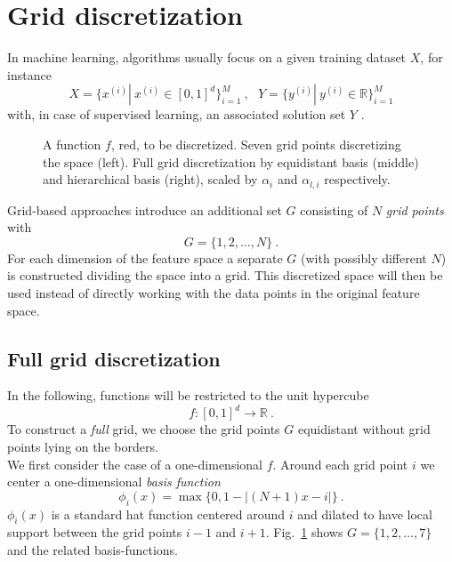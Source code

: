 \section{Grid discretization}\label{sec:grid}

In machine learning, algorithms usually focus on a given training dataset
$X$, for instance
$$ X = \{x^{(i)} | \ x^{(i)} \in [0, 1]^d\}_{i = 1}^M \ , \ \ \
Y = \{y^{(i)} | \ y^{(i)} \in \mathbb{R}\}_{i=1}^M$$
with, in case of supervised learning, an associated solution set $Y$
\cite{artbunshort}.

\par

\begin{figure}[t!]
  \centering
  
  
  
  \caption{A function $f$, red, to be discretized.
    Seven grid points discretizing the space
    (left). Full grid discretization by equidistant basis (middle) and
    hierarchical basis (right), scaled by $\alpha_i$ and $\alpha_{l,i}$
    respectively.\label{fig:fig1}}
\end{figure}

Grid-based approaches introduce an additional set $G$ consisting of $N$
\emph{grid points} with
$$ G = \{1,2,\dots,N\} \ .$$
For each dimension of the feature space a separate $G$ (with possibly
different $N$) is constructed dividing the space into a grid.
This discretized space
will then be used instead of directly working with the data points in the original
feature space.

\subsection{Full grid discretization}\label{subsec:fullgrid}
In the following, functions
will be restricted to the unit hypercube
 $$ f: [0, 1]^d \rightarrow \mathbb{R} \ .$$
To construct a \emph{full} grid, we choose the grid points $G$ equidistant
without grid points lying on the borders. \\
We first consider the case of a one-dimensional $f$.
Around each grid point $i$ we center a one-dimensional
\emph{basis function}
$$ \phi_i(x) = \max\{0, 1 - |(N + 1)x - i|\} \ .$$
$\phi_i(x)$ is a standard hat function centered around $i$ and dilated
to have local support between the grid points $i - 1$ and $i + 1$. Fig.~\ref{fig:fig1}
shows $G = \{1,2,\dots,7\}$ and the related basis-functions.

